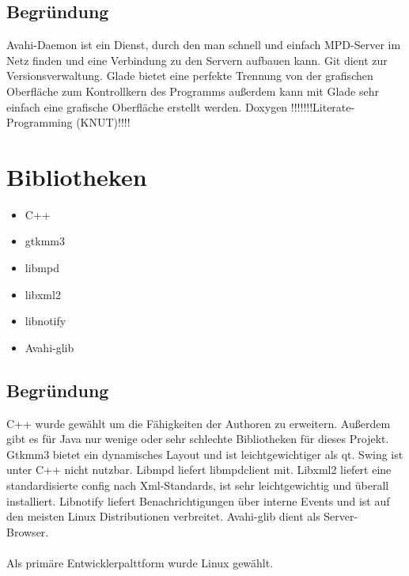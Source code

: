 \subsection{Begründung}
Avahi-Daemon ist ein Dienst, durch den man schnell und einfach MPD-Server im Netz finden und eine 
Verbindung zu den Servern aufbauen kann. Git dient zur Versionsverwaltung. Glade bietet eine perfekte
Trennung von der grafischen Oberfläche zum Kontrollkern des Programms außerdem kann mit Glade sehr 
einfach eine grafische Oberfläche erstellt werden. Doxygen !!!!!!!Literate-Programming (KNUT)!!!!
\section{Bibliotheken}
\begin{itemize}
	\item C++
	\item gtkmm3
	\item libmpd
	\item libxml2
	\item libnotify
	\item Avahi-glib
\end{itemize}
\subsection{Begründung}
C++ wurde gewählt um die Fähigkeiten der Authoren zu erweitern. Außerdem gibt es für Java nur wenige
oder sehr schlechte Bibliotheken für dieses Projekt. Gtkmm3 bietet ein dynamisches Layout und ist 
leichtgewichtiger als qt. Swing ist unter C++ nicht nutzbar. Libmpd liefert libmpdclient mit.
Libxml2 liefert eine standardisierte config nach Xml-Standards, ist sehr leichtgewichtig und überall
installiert. Libnotify liefert Benachrichtigungen über interne Events und ist auf den meisten Linux
Distributionen verbreitet. Avahi-glib dient als Server-Browser.\ \\ \\
Als primäre Entwicklerpalttform wurde Linux gewählt.
